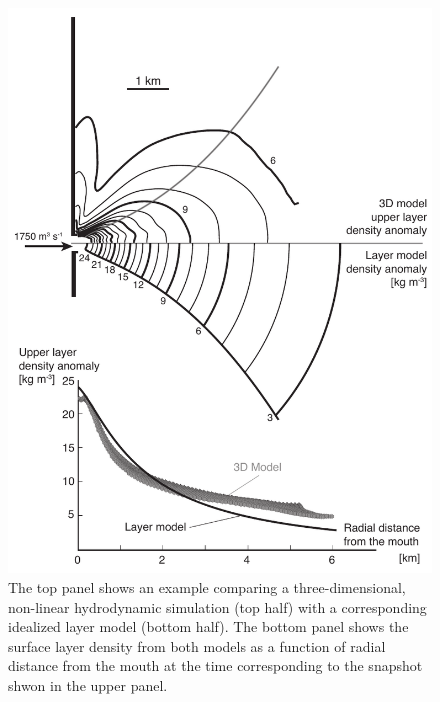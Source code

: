 \documentclass[12pt]{article}
\begin{document}
\begin{figure}
    \centering
    \includegraphics{Figures/ideal_comp_rev1.pdf}
    \caption{The top panel shows an example comparing a three-dimensional, non-linear hydrodynamic simulation (top half) with a corresponding idealized layer model (bottom half). The bottom panel shows the surface layer density from both models as a function of radial distance from the mouth at the time corresponding to the snapshot shwon in the upper panel.}
    \label{fig:my_label}
\end{figure}
\end{document}
